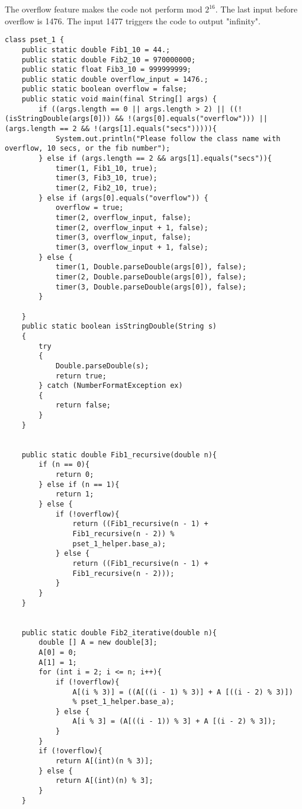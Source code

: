 \documentclass[11pt, solution, letterpaper]{format}
\begin{document}
The overflow feature makes the code not perform mod $2^{16}$. The last input before overflow is 1476. The input 1477 triggers the code to output "infinity".
\begin{lstlisting}
class pset_1 {
    public static double Fib1_10 = 44.; 
    public static double Fib2_10 = 970000000;
    public static float Fib3_10 = 999999999;
    public static double overflow_input = 1476.;
    public static boolean overflow = false;
    public static void main(final String[] args) {
        if ((args.length == 0 || args.length > 2) || ((!(isStringDouble(args[0])) && !(args[0].equals("overflow"))) || (args.length == 2 && !(args[1].equals("secs"))))){
            System.out.println("Please follow the class name with overflow, 10 secs, or the fib number");
        } else if (args.length == 2 && args[1].equals("secs")){  
            timer(1, Fib1_10, true);
            timer(3, Fib3_10, true);
            timer(2, Fib2_10, true);
        } else if (args[0].equals("overflow")) {
            overflow = true;
            timer(2, overflow_input, false);
            timer(2, overflow_input + 1, false);
            timer(3, overflow_input, false);
            timer(3, overflow_input + 1, false);
        } else {       
            timer(1, Double.parseDouble(args[0]), false);
            timer(2, Double.parseDouble(args[0]), false);
            timer(3, Double.parseDouble(args[0]), false);
        }
       
    }
    public static boolean isStringDouble(String s)
    {
        try
        {
            Double.parseDouble(s);
            return true;
        } catch (NumberFormatException ex)
        {
            return false;
        }
    }

 
    public static double Fib1_recursive(double n){
        if (n == 0){
            return 0;
        } else if (n == 1){
            return 1;
        } else {
            if (!overflow){
                return ((Fib1_recursive(n - 1) + 
                Fib1_recursive(n - 2)) % 
                pset_1_helper.base_a);
            } else {
                return ((Fib1_recursive(n - 1) + 
                Fib1_recursive(n - 2)));
            }
        }
    }


    public static double Fib2_iterative(double n){
        double [] A = new double[3];
        A[0] = 0; 
        A[1] = 1;
        for (int i = 2; i <= n; i++){
            if (!overflow){
                A[(i % 3)] = ((A[((i - 1) % 3)] + A [((i - 2) % 3)]) 
                % pset_1_helper.base_a);
            } else {
                A[i % 3] = (A[((i - 1)) % 3] + A [(i - 2) % 3]);
            }
        }
        if (!overflow){
            return A[(int)(n % 3)];
        } else {
            return A[(int)(n) % 3];
        }
    }



\end{lstlisting}
\end{document}
